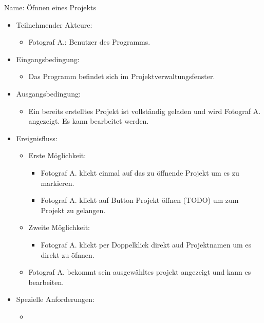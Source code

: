\begin{itemize}
		Name: Öfnnen eines Projekts
		\begin{itemize}
			\item Teilnehmender Akteure:
			\begin{itemize}
				\item	Fotograf A.: Benutzer des Programms.		
			\end{itemize}
			\item Eingangsbedingung:
			\begin{itemize}
				\item	Das Programm befindet sich im Projektverwaltungsfenster.		
			\end{itemize}
			\item Ausgangsbedingung:
			\begin{itemize}
				\item	Ein bereits erstelltes Projekt ist vollständig geladen und wird Fotograf A. angezeigt. Es kann bearbeitet werden.		
			\end{itemize}
			\item Ereignisfluss:
			\begin{itemize}
				\item Erste Möglichkeit:
				\begin{itemize}
					\item Fotograf A. klickt einmal auf das zu öffnende Projekt um es zu markieren.
					\item Fotograf A. klickt auf Button Projekt öffnen (TODO) um zum Projekt zu gelangen.
				\end{itemize}
				\item Zweite Möglichkeit:
				\begin{itemize}
					\item Fotograf A. klickt per Doppelklick direkt aud Projektnamen um es direkt zu öfnnen.					
				\end{itemize}
				\item Fotograf A. bekommt sein ausgewähltes projekt angezeigt und kann es bearbeiten.					
			\end{itemize}
			\item Spezielle Anforderungen:
			\begin{itemize}
				\item			
			\end{itemize}			
		\end{itemize}
		

\end{itemize}
